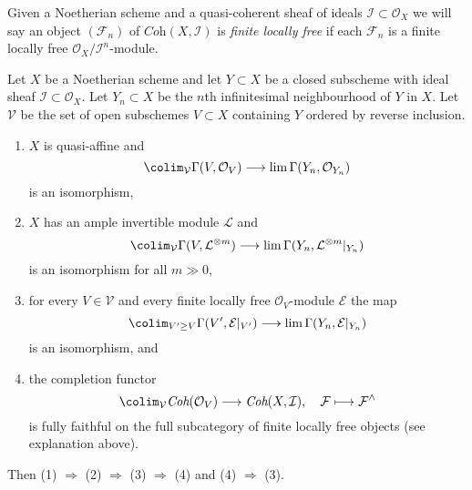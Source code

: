 \noindent
Given a Noetherian scheme and a quasi-coherent sheaf of ideals
$\mathcal{I} \subset \mathcal{O}_X$ we will say
an object $(\mathcal{F}_n)$ of $\textit{Coh}(X, \mathcal{I})$
is {\it finite locally free} if each $\mathcal{F}_n$ is a finite
locally free $\mathcal{O}_X/\mathcal{I}^n$-module.

\begin{lemma}
\label{lemma-completion-fully-faithful-general}
Let $X$ be a Noetherian scheme and let $Y \subset X$ be a closed subscheme
with ideal sheaf $\mathcal{I} \subset \mathcal{O}_X$.
Let $Y_n \subset X$ be the $n$th infinitesimal neighbourhood of $Y$ in $X$.
Let $\mathcal{V}$ be the set of open subschemes $V \subset X$ containing $Y$
ordered by reverse inclusion.
\begin{enumerate}
\item $X$ is quasi-affine and
$$
\colim_\mathcal{V} \Gamma(V, \mathcal{O}_V)
\longrightarrow
\lim \Gamma(Y_n, \mathcal{O}_{Y_n})
$$
is an isomorphism,
\item $X$ has an ample invertible module $\mathcal{L}$ and
$$
\colim_\mathcal{V} \Gamma(V, \mathcal{L}^{\otimes m})
\longrightarrow
\lim \Gamma(Y_n, \mathcal{L}^{\otimes m}|_{Y_n})
$$
is an isomorphism for all $m \gg 0$,
\item for every $V \in \mathcal{V}$ and every finite locally free
$\mathcal{O}_V$-module $\mathcal{E}$ the map
$$
\colim_{V' \geq V} \Gamma(V', \mathcal{E}|_{V'})
\longrightarrow
\lim \Gamma(Y_n, \mathcal{E}|_{Y_n})
$$
is an isomorphism, and
\item the completion functor
$$
\colim_\mathcal{V} \textit{Coh}(\mathcal{O}_V)
\longrightarrow
\textit{Coh}(X, \mathcal{I}),
\quad
\mathcal{F} \longmapsto \mathcal{F}^\wedge
$$
is fully faithful on the full subcategory of
finite locally free objects (see explanation above).
\end{enumerate}
Then (1) $\Rightarrow$ (2) $\Rightarrow$ (3) $\Rightarrow$ (4)
and (4) $\Rightarrow$ (3).
\end{lemma}

